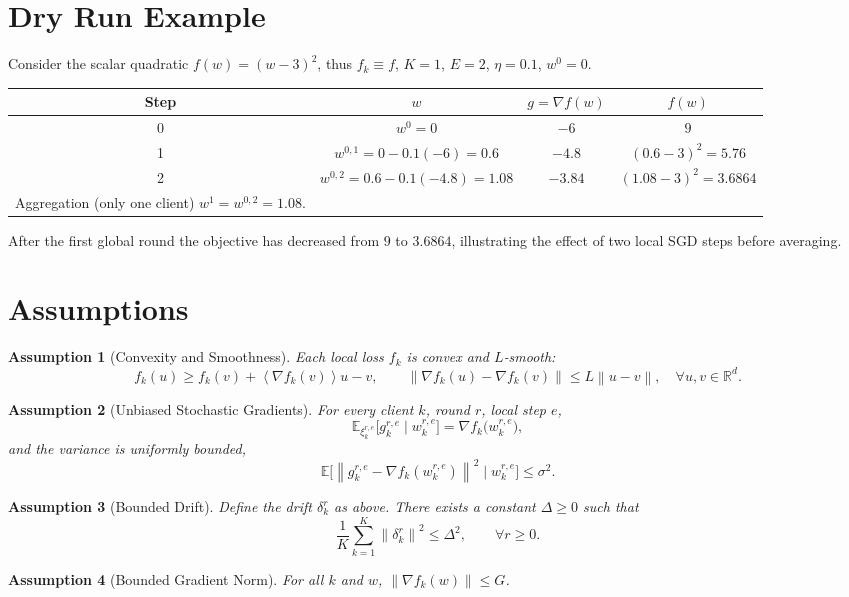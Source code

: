 \documentclass[11pt]{article}
\newtheorem{assumption}{Assumption}
\newcommand{\E}{\mathbb{E}}
\newcommand{\R}{\mathbb{R}}
\newcommand{\norm}[1]{\left\|#1\right\|}
\newcommand{\inner}[1]{\left\langle#1\right\rangle}
\begin{document}
\section*{Dry Run Example}
Consider the scalar quadratic $f(w)=(w-3)^{2}$, thus $f_k\equiv f$, $K=1$, $E=2$, $\eta=0.1$, $w^{0}=0$.

\begin{tabular}{c|c|c|c}
Step & $w$ & $g=\nabla f(w)$ & $f(w)$\\\hline
0 & $w^{0}=0$ & $-6$ & $9$\\
1 & $w^{0,1}=0-0.1(-6)=0.6$ & $-4.8$ & $(0.6-3)^{2}=5.76$\\
2 & $w^{0,2}=0.6-0.1(-4.8)=1.08$ & $-3.84$ & $(1.08-3)^{2}=3.6864$\\
\hline
Aggregation (only one client) $w^{1}=w^{0,2}=1.08$.
\end{tabular}

After the first global round the objective has decreased from $9$ to $3.6864$, illustrating the effect of two local SGD steps before averaging.

\newpage
\section*{Assumptions}
\begin{assumption}[Convexity and Smoothness]\label{assump:convex}
Each local loss $f_k$ is convex and $L$‑smooth:
\[
f_k(u)\ge f_k(v)+\inner{\nabla f_k(v)}{u-v},\qquad
\norm{\nabla f_k(u)-\nabla f_k(v)}\le L\norm{u-v},\quad\forall u,v\in\R^{d}.
\]
\end{assumption}
\begin{assumption}[Unbiased Stochastic Gradients]\label{assump:unbiased}
For every client $k$, round $r$, local step $e$,
\[
\E_{\xi_{k}^{r,e}}\!\bigl[g_{k}^{r,e}\mid w_{k}^{r,e}\bigr]=\nabla f_k\!\bigl(w_{k}^{r,e}\bigr),
\]
and the variance is uniformly bounded,
\[
\E\!\bigl[\norm{g_{k}^{r,e}-\nabla f_k(w_{k}^{r,e})}^{2}\mid w_{k}^{r,e}\bigr]\le\sigma^{2}.
\]
\end{assumption}
\begin{assumption}[Bounded Drift]\label{assump:drift}
Define the drift $\delta_{k}^{r}$ as above. There exists a constant $\Delta\ge0$ such that
\[
\frac{1}{K}\sum_{k=1}^{K}\norm{\delta_{k}^{r}}^{2}\le\Delta^{2},\qquad\forall r\ge0.
\]
\end{assumption}
\begin{assumption}[Bounded Gradient Norm]\label{assump:gradbound}
For all $k$ and $w$, $\norm{\nabla f_k(w)}\le G$.
\end{assumption}
\end{document}
